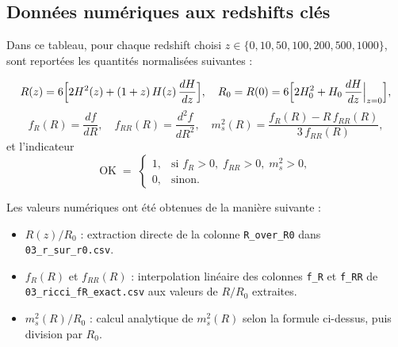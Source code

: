 \subsection{Données numériques aux redshifts clés}

Dans ce tableau, pour chaque redshift choisi \(z\in\{0,10,50,100,200,500,1000\}\), sont reportées les quantités normalisées suivantes :

\[
  R(z)
  =6\Bigl[2H^2(z)+(1+z)\,H(z)\,\frac{dH}{dz}\Bigr],
  \quad
  R_{0}
  =R(0)
  =6\Bigl[2H_{0}^{2}
    + H_{0}\,\frac{dH}{dz}\Bigl|_{z=0}\Bigr],
\]
\[
  f_{R}(R)
  =\frac{df}{dR},
  \quad
  f_{RR}(R)
  =\frac{d^{2}f}{dR^{2}},
  \quad
  m_{s}^{2}(R)
  =\frac{f_{R}(R)-R\,f_{RR}(R)}{3\,f_{RR}(R)},
\]
et l’indicateur
\[
  \mathrm{OK} \;=\;
    \begin{cases}
      1, & \text{si }f_{R}>0,\;f_{RR}>0,\;m_{s}^{2}>0,\\
      0, & \text{sinon.}
    \end{cases}
\]

\bigskip
Les valeurs numériques ont été obtenues de la manière suivante :

\begin{itemize}
  \item \(\displaystyle R(z)/R_{0}\) : extraction directe de la colonne \texttt{R\_over\_R0} dans \texttt{03\_r\_sur\_r0.csv}.
  \item \(f_{R}(R)\) et \(f_{RR}(R)\) : interpolation linéaire des colonnes \texttt{f\_R} et \texttt{f\_RR} de \texttt{03\_ricci\_fR\_exact.csv} aux valeurs de \(R/R_{0}\) extraites.
  \item \(m_{s}^{2}(R)/R_{0}\) : calcul analytique de \(m_{s}^{2}(R)\) selon la formule ci-dessus, puis division par \(R_{0}\).
\end{itemize}

